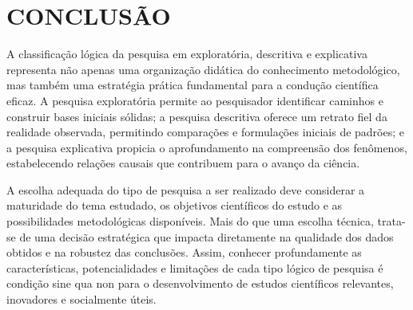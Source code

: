   
\section{\esp CONCLUSÃO}

A classificação lógica da pesquisa em exploratória, descritiva e explicativa representa não apenas uma organização didática do conhecimento metodológico, mas também uma estratégia prática fundamental para a condução científica eficaz. A pesquisa exploratória permite ao pesquisador identificar caminhos e construir bases iniciais sólidas; a pesquisa descritiva oferece um retrato fiel da realidade observada, permitindo comparações e formulações iniciais de padrões; e a pesquisa explicativa propicia o aprofundamento na compreensão dos fenômenos, estabelecendo relações causais que contribuem para o avanço da ciência.

A escolha adequada do tipo de pesquisa a ser realizado deve considerar a maturidade do tema estudado, os objetivos científicos do estudo e as possibilidades metodológicas disponíveis. Mais do que uma escolha técnica, trata-se de uma decisão estratégica que impacta diretamente na qualidade dos dados obtidos e na robustez das conclusões. Assim, conhecer profundamente as características, potencialidades e limitações de cada tipo lógico de pesquisa é condição sine qua non para o desenvolvimento de estudos científicos relevantes, inovadores e socialmente úteis.

\nocite{artigo01}
\nocite{artigo02}
\nocite{artigo03}
\nocite{videoaula}





% 
